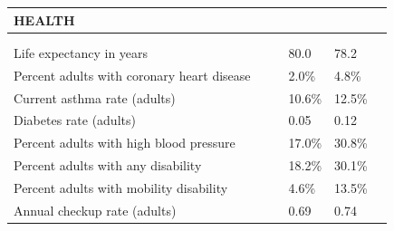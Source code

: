 \documentclass[9pt]{report}
\begin{document}
\newpage
\setlength{\tabcolsep}{.01in} %
\begin{tabular}{p{.10in}p{.10in}p{.10in}p{3.7in}>{\hfill}p{.85in}>{\hfill}p{.85in}>{\hfill}p{.85in}>{\hfill}p{.85in}p{0.1in}}
\multicolumn{9}{l}{\parbox{7.1in}{\raggedright{\large{\strut\textbf{HEALTH}\strut}}}} \\ 
\hline
\multicolumn{4}{l}{\parbox{3.5in}{\raggedright{\textbf{}}}} & \multicolumn{1}{r}{\parbox{.85in}{\strut\raggedleft{\textbf{}\strut}}} & \multicolumn{1}{r}{\parbox{.85in}{\strut\raggedleft{\textbf{}\strut}}} & \multicolumn{1}{r}{\parbox{.85in}{\strut{}}} & \multicolumn{1}{r}{\parbox{.85in}{\strut{}}} & \\ 
\multicolumn{9}{l}{} \\ 
\multicolumn{4}{l}{\parbox{3.6in}{\strut\raggedright{{Life expectancy in years}}\strut}} &  &  & 80.0 & 78.2 & \multicolumn{1}{l}{}  \\ 
\multicolumn{4}{l}{\parbox{3.6in}{\strut\raggedright{{Percent adults with coronary heart disease}}\strut}} &  &  & 2.0\% & 4.8\% & \multicolumn{1}{l}{}  \\ 
\multicolumn{4}{l}{\parbox{3.6in}{\strut\raggedright{{Current asthma rate (adults)}}\strut}} &  &  & 10.6\% & 12.5\% & \multicolumn{1}{l}{}  \\ 
\multicolumn{4}{l}{\parbox{3.6in}{\strut\raggedright{{Diabetes rate (adults)}}\strut}} &  &  & 0.05 & 0.12 & \multicolumn{1}{l}{}  \\ 
\multicolumn{4}{l}{\parbox{3.6in}{\strut\raggedright{{Percent adults with high blood pressure}}\strut}} &  &  & 17.0\% & 30.8\% & \multicolumn{1}{l}{}  \\ 
\multicolumn{4}{l}{\parbox{3.6in}{\strut\raggedright{{Percent adults with any disability}}\strut}} &  &  & 18.2\% & 30.1\% & \multicolumn{1}{l}{}  \\ 
\multicolumn{4}{l}{\parbox{3.6in}{\strut\raggedright{{Percent adults with mobility disability}}\strut}} &  &  & 4.6\% & 13.5\% & \multicolumn{1}{l}{}  \\ 
\multicolumn{4}{l}{\parbox{3.6in}{\strut\raggedright{{Annual checkup rate (adults)}}\strut}} &  &  & 0.69 & 0.74 & \multicolumn{1}{l}{}  \\ 

\end{tabular}
\end{document}

